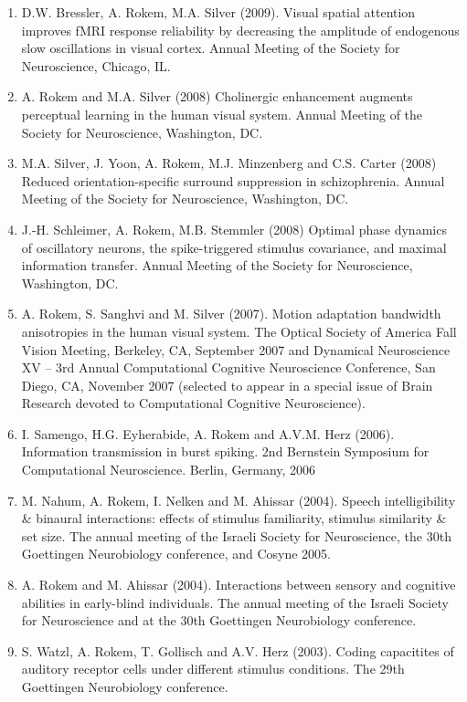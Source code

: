 \documentclass[11pt,fullpage]{article}
\begin{document}
\begin{enumerate}
\item D.W. Bressler, A. Rokem, M.A. Silver (2009). Visual spatial attention improves fMRI response reliability by decreasing the amplitude of endogenous slow oscillations in visual cortex. Annual Meeting of the Society for Neuroscience, Chicago, IL.

\item A. Rokem and M.A. Silver (2008) Cholinergic enhancement augments perceptual learning in the human visual system. Annual Meeting of the Society for Neuroscience, Washington, DC.

\item M.A. Silver, J. Yoon, A. Rokem, M.J. Minzenberg and C.S. Carter (2008) Reduced orientation-specific surround suppression in schizophrenia. Annual Meeting of the Society for Neuroscience, Washington, DC.

\item J.-H. Schleimer, A. Rokem, M.B. Stemmler (2008) Optimal phase dynamics of oscillatory neurons, the spike-triggered stimulus covariance, and maximal information transfer. Annual Meeting of the Society for Neuroscience, Washington, DC.

\item A. Rokem, S. Sanghvi and M. Silver (2007). Motion adaptation bandwidth anisotropies in the human visual system. The Optical Society of America Fall Vision Meeting, Berkeley, CA, September 2007 and Dynamical Neuroscience XV – 3rd Annual Computational Cognitive Neuroscience Conference, San Diego, CA, November 2007 (selected to appear in a special issue of Brain Research devoted to Computational Cognitive Neuroscience).

\item I. Samengo, H.G. Eyherabide, A. Rokem and A.V.M. Herz (2006). Information transmission in burst spiking. 2nd Bernstein Symposium for Computational Neuroscience. Berlin, Germany, 2006

\item M. Nahum, A. Rokem, I. Nelken and M. Ahissar (2004). Speech intelligibility \& binaural interactions: effects of stimulus familiarity, stimulus similarity \& set size. The annual meeting of the Israeli Society for Neuroscience, the 30th Goettingen Neurobiology conference, and Cosyne 2005.

\item A. Rokem and M. Ahissar (2004). Interactions between sensory and cognitive abilities in early-blind individuals. The annual meeting of the Israeli Society for Neuroscience and at the 30th Goettingen Neurobiology conference.

\item S. Watzl, A. Rokem, T. Gollisch and A.V. Herz (2003). Coding capacitites of auditory receptor cells under different stimulus conditions. The 29th Goettingen Neurobiology conference.
\end{enumerate}
\end{document}
